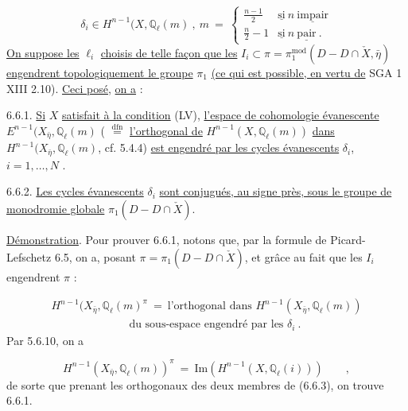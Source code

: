 \begin{equation*}
\delta_{i} \in H^{n-1}(X,\mathbb{Q}_{\ell}(m) \ , \ m \ = \ \left\{ \begin{array}{ll} \frac{n-1}{2} & \underline{\mbox{si}}\ n\ \underline{\mbox{impair}} \\[2ex] \frac{n}{2} - 1 & \underline{\mbox{si}}\ n\ \underline{\mbox{pair}} \ . \end{array} \right.
\end{equation*}
\underline{On suppose les} $\ell_{i}$ \underline{choisis de telle façon que les} $I_{i} \subset \pi = \pi_{1}^{\mathrm{mod}}(D-D \cap \check{X},\bar{\eta})$ \underline{engendrent topologiquement le groupe} $\pi_{1}$ \underline{(ce qui est possible, en vertu de} SGA 1 XIII 2.10). \underline{Ceci posé}, \underline{on a} :

6.6.1. \underline{Si} $X$ \underline{satisfait à la condition} (LV), \underline{l'espace de cohomologie évanescente} $E^{n-1}(X_{\bar{\eta}},\mathbb{Q}_{\ell}(m)$ ( $\stackrel{\mathrm{dfn}}{=}$ \underline{l'orthogonal de} $H^{n-1}(X,\mathbb{Q}_{\ell}(m))$ \underline{dans} $H^{n-1}(X_{\bar{\eta}},\mathbb{Q}_{\ell}(m)$, cf. 5.4.4) \underline{est engendré par les cycles évanescents} $\delta_{i}$, $i=1,\ldots,N$ .

6.6.2. \underline{Les cycles évanescents} $\delta_{i}$ \underline{sont conjugués, au signe près, sous le groupe de monodromie globale} $\pi_{1}(D - D \cap \check{X})$.

\underline{Démonstration}. Pour prouver 6.6.1, notons que, par la formule de Picard-Lefschetz 6.5, on a, posant $\pi = \pi_{1}(D - D \cap \check{X})$, et grâce au fait que les $I_{i}$ engendrent $\pi$ :



\begin{equation}\tag{6.6.3}
\begin{array}{l} H^{n-1}(X_{\bar{\eta}},\mathbb{Q}_{\ell}(m)^{\pi} \ = \ \mbox{l'orthogonal dans } H^{n-1}(X_{\bar{\eta}},\mathbb{Q}_{\ell}(m)) \\[1.5ex] \hspace{7em} \mbox{du sous-espace engendré par les } \delta_{i} \ . \end{array}
\end{equation}
Par 5.6.10, on a

\begin{equation}\tag{6.6.4}
H^{n-1}(X_{\bar{\eta}},\mathbb{Q}_{\ell}(m))^{\pi} \ = \ \mathrm{Im}(H^{n-1}(X,\mathbb{Q}_{\ell}(i))) \qquad ,
\end{equation}
de sorte que prenant les orthogonaux des deux membres de (6.6.3), on trouve 6.6.1.

